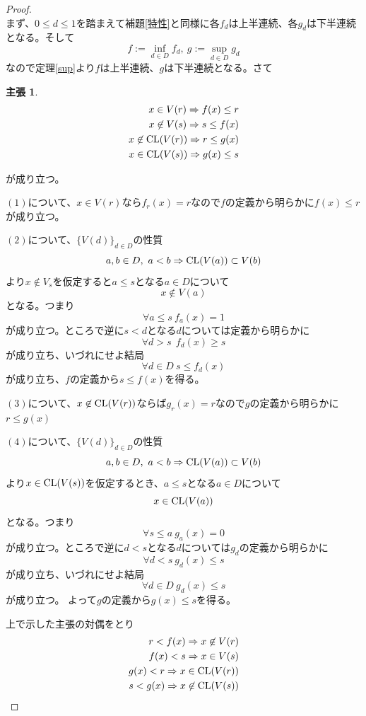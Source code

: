\documentclass[leqno]{jsarticle}
\newtheorem*{claim}{主張}
\newcommand{\cl}{\text{{\rm CL}} }
\begin{document}
\begin{proof}${}$\\ 
まず、$0\le d \le1$を踏まえて補題\ref{特性}と同様に各$f_d$は上半連続、各$g_d$は下半連続となる。そして
\[
f:=\inf_{d\in D}f_d,\ 
g:=\sup_{d\in D}g_d
\]
なので定理\ref{sup}より$f$は上半連続、$g$は下半連続となる。さて
\begin{claim}
\begin{align}
x\in V(r)\Rightarrow f(x)\le r\\ 
x\not\in V(s)\Rightarrow s\le f(x)\\ 
x\not\in \cl(V(r))\Rightarrow r\le g(x)\\ 
x\in \cl(V(s))\Rightarrow g(x)\le s
\end{align}
\end{claim}が成り立つ。\par
[主張の証明]\par
$(1)$について、$x\in V(r)$なら$f_r(x)=r$なので$f$の定義から明らかに$f(x)\le r$が成り立つ。\par
$(2)$について、$\{V(d)\}_{d\in D}$の性質
\[
a,b\in D,\ a<b\Rightarrow \cl(V(a))\subset V(b)
\]
より$x\not\in V_s$を仮定すると$a\le s$となる$a\in D$について
\[
x\not\in V(a)
\]
となる。つまり
\[
\forall a\le s\ f_a(x)=1
\]が成り立つ。ところで逆に$s<d$となる$d$については定義から明らかに
\[
\forall d>s\ \ f_d(x)\ge s
\]
が成り立ち、いづれにせよ結局
\[
\forall d\in D\ s\le f_{d}(x)
\]
が成り立ち、$f$の定義から$s\le f(x)$を得る。\par
$(3)$について、$x\not\in \cl(V(r))$ならば$g_r(x)=r$なので$g$の定義から明らかに$r\le g(x)$\par 
$(4)$について、$\{V(d)\}_{d\in D}$の性質
\[
a,b\in D,\ a<b\Rightarrow \cl(V(a))\subset V(b)
\]
より$x\in \cl(V(s))$を仮定するとき、$a\le s$となる$a\in D$について
\[
x\in \cl(V(a))
\]
となる。つまり
\[
\forall s\le a\ g_a(x)=0
\]が成り立つ。ところで逆に$d<s$となる$d$については$g_d$の定義から明らかに
\[
\forall d<s\ g_d(x)\le s
\]
が成り立ち、いづれにせよ結局
\[
\forall d\in D\ g_{d}(x)\le s
\]
が成り立つ。
よって$g$の定義から$g(x)\le s$を得る。\par
[主張の証明終わり]\par
上で示した主張の対偶をとり
\begin{align}
r<f(x)\Rightarrow x\not\in V(r)\\ 
f(x)<s\Rightarrow x\in V(s) \\ 
g(x)<r\Rightarrow x\in \cl(V(r))\\ 
s<g(x)\Rightarrow x\not\in \cl(V(s))
\end{align}

\end{proof}
\end{document}
